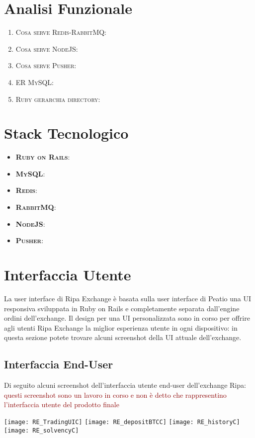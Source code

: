\documentclass[11pt,fleqn,oneside]{book} %
\begin{document}
\section{Analisi Funzionale}
\begin{enumerate}
	\item \textsc{Cosa serve Redis-RabbitMQ}:
	\item \textsc{Cosa serve NodeJS}: 
	\item \textsc{Cosa serve Pusher}:
	\item \textsc{ER MySQL}:
	\item \textsc{Ruby gerarchia directory}:
\end{enumerate}

\section{Stack Tecnologico}
\begin{itemize}
	\item \textbf{\textsc{Ruby on Rails}}:
	\item \textbf{\textsc{MySQL}}: 
	\item \textbf{\textsc{Redis}}:
	\item \textbf{\textsc{RabbitMQ}}:
	\item \textbf{\textsc{NodeJS}}:
	\item \textbf{\textsc{Pusher}}:
\end{itemize}

\section{Interfaccia Utente}
La user interface di Ripa Exchange è basata sulla user interface di Peatio una UI responsiva sviluppata in Ruby on Rails e 
completamente separata dall'engine ordini dell'exchange.
Il design per una UI personalizzata sono in corso per offrire agli utenti Ripa Exchange la miglior esperienza utente in ogni
dispositivo: in questa sezione potete trovare alcuni screenshot della UI attuale dell'exchange.

\subsection{Interfaccia End-User}
Di seguito alcuni screenshot dell'interfaccia utente end-user dell'exchange Ripa:
\textcolor{darkred}{questi screenshot sono un lavoro in corso e non è detto che rappresentino l'interfaccia utente del prodotto finale}\\
\begin{center}
	\texttt{[image: RE\_TradingUIC]}
	\texttt{[image: RE\_depositBTCC]}
	\texttt{[image: RE\_historyC]}
	\texttt{[image: RE\_solvencyC]}
\end{center}
\end{document}
